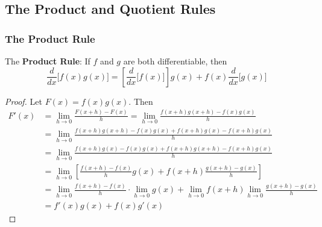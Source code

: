 \subsection{The Product and Quotient Rules}

\subsubsection*{The Product Rule}
The \textbf{Product Rule}: If \(f\) and \(g\) are both differentiable, then
\[\frac{d}{dx}\bigl[f(x)g(x)\bigr]
=\left[\frac{d}{dx}\bigl[f(x)\bigr]\right]g(x)+f(x)\frac{d}{dx}\bigl[g(x)\bigr]\]
\begin{proof}
    Let \(F(x)=f(x)g(x)\).
    Then
    \begin{align*}
        F'(x) 
        &= \lim_{h\to 0}\frac{F(x+h)-F(x)}{h}
        =\lim_{h\to 0}\frac{f(x+h)g(x+h)-f(x)g(x)}{h} \\
        &= \lim_{h\to 0}\frac{f(x+h)g(x+h)-f(x)g(x)+f(x+h)g(x)-f(x+h)g(x)}{h} \\
        &= \lim_{h\to 0}\frac{f(x+h)g(x)-f(x)g(x)+f(x+h)g(x+h)-f(x+h)g(x)}{h} \\
        &= \lim_{h\to 0}
        \left[\frac{f(x+h)-f(x)}{h}g(x)+f(x+h)\frac{g(x+h)-g(x)}{h}\right] \\
        &= \lim_{h\to 0}\frac{f(x+h)-f(x)}{h}\cdot\lim_{h\to 0}g(x)
        +\lim_{h\to 0}f(x+h)\lim_{h\to 0}\frac{g(x+h)-g(x)}{h} \\
        &= f'(x)g(x)+f(x)g'(x)
    \end{align*}
\end{proof}

